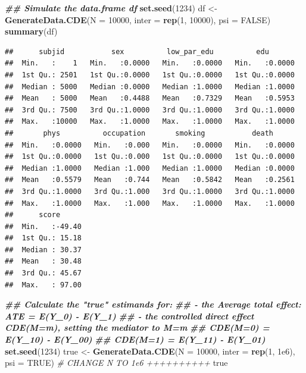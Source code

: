 \documentclass[
]{book}
\newenvironment{Shaded}{\begin{snugshade}}{\end{snugshade}}
\newcommand{\AttributeTok}[1]{\textcolor[rgb]{0.13,0.29,0.53}{#1}}
\newcommand{\CommentTok}[1]{\textcolor[rgb]{0.56,0.35,0.01}{\textit{#1}}}
\newcommand{\ConstantTok}[1]{\textcolor[rgb]{0.56,0.35,0.01}{#1}}
\newcommand{\DecValTok}[1]{\textcolor[rgb]{0.00,0.00,0.81}{#1}}
\newcommand{\DocumentationTok}[1]{\textcolor[rgb]{0.56,0.35,0.01}{\textbf{\textit{#1}}}}
\newcommand{\FloatTok}[1]{\textcolor[rgb]{0.00,0.00,0.81}{#1}}
\newcommand{\FunctionTok}[1]{\textcolor[rgb]{0.13,0.29,0.53}{\textbf{#1}}}
\newcommand{\NormalTok}[1]{#1}
\newcommand{\OtherTok}[1]{\textcolor[rgb]{0.56,0.35,0.01}{#1}}
\begin{document}
\begin{Shaded}
\begin{Highlighting}[]
\DocumentationTok{\#\# Simulate the data.frame df }
\FunctionTok{set.seed}\NormalTok{(}\DecValTok{1234}\NormalTok{)}
\NormalTok{df }\OtherTok{\textless{}{-}} \FunctionTok{GenerateData.CDE}\NormalTok{(}\AttributeTok{N =} \DecValTok{10000}\NormalTok{, }\AttributeTok{inter =} \FunctionTok{rep}\NormalTok{(}\DecValTok{1}\NormalTok{, }\DecValTok{10000}\NormalTok{), }\AttributeTok{psi =} \ConstantTok{FALSE}\NormalTok{)}
\FunctionTok{summary}\NormalTok{(df)}
\end{Highlighting}
\end{Shaded}

\begin{verbatim}
##      subjid           sex          low_par_edu          edu        
##  Min.   :    1   Min.   :0.0000   Min.   :0.0000   Min.   :0.0000  
##  1st Qu.: 2501   1st Qu.:0.0000   1st Qu.:0.0000   1st Qu.:0.0000  
##  Median : 5000   Median :0.0000   Median :1.0000   Median :1.0000  
##  Mean   : 5000   Mean   :0.4488   Mean   :0.7329   Mean   :0.5953  
##  3rd Qu.: 7500   3rd Qu.:1.0000   3rd Qu.:1.0000   3rd Qu.:1.0000  
##  Max.   :10000   Max.   :1.0000   Max.   :1.0000   Max.   :1.0000  
##       phys          occupation       smoking           death       
##  Min.   :0.0000   Min.   :0.000   Min.   :0.0000   Min.   :0.0000  
##  1st Qu.:0.0000   1st Qu.:0.000   1st Qu.:0.0000   1st Qu.:0.0000  
##  Median :1.0000   Median :1.000   Median :1.0000   Median :0.0000  
##  Mean   :0.5579   Mean   :0.744   Mean   :0.5842   Mean   :0.2561  
##  3rd Qu.:1.0000   3rd Qu.:1.000   3rd Qu.:1.0000   3rd Qu.:1.0000  
##  Max.   :1.0000   Max.   :1.000   Max.   :1.0000   Max.   :1.0000  
##      score       
##  Min.   :-49.40  
##  1st Qu.: 15.18  
##  Median : 30.37  
##  Mean   : 30.48  
##  3rd Qu.: 45.67  
##  Max.   : 97.00
\end{verbatim}

\begin{Shaded}
\begin{Highlighting}[]
\DocumentationTok{\#\# Calculate the "true" estimands for:}
\DocumentationTok{\#\#  {-} the Average total effect: ATE = E(Y\_0) {-} E(Y\_1)}
\DocumentationTok{\#\#  {-} the controlled direct effect CDE(M=m), setting the mediator to M=m}
\DocumentationTok{\#\#    CDE(M=0) = E(Y\_10) {-} E(Y\_00)}
\DocumentationTok{\#\#    CDE(M=1) = E(Y\_11) {-} E(Y\_01)}
\FunctionTok{set.seed}\NormalTok{(}\DecValTok{1234}\NormalTok{)}
\NormalTok{true }\OtherTok{\textless{}{-}} \FunctionTok{GenerateData.CDE}\NormalTok{(}\AttributeTok{N =} \DecValTok{10000}\NormalTok{, }\AttributeTok{inter =} \FunctionTok{rep}\NormalTok{(}\DecValTok{1}\NormalTok{, }\FloatTok{1e6}\NormalTok{), }\AttributeTok{psi =} \ConstantTok{TRUE}\NormalTok{) }\CommentTok{\# CHANGE N TO 1e6 ++++++++++}
\NormalTok{true}
\end{Highlighting}
\end{Shaded}
\end{document}
